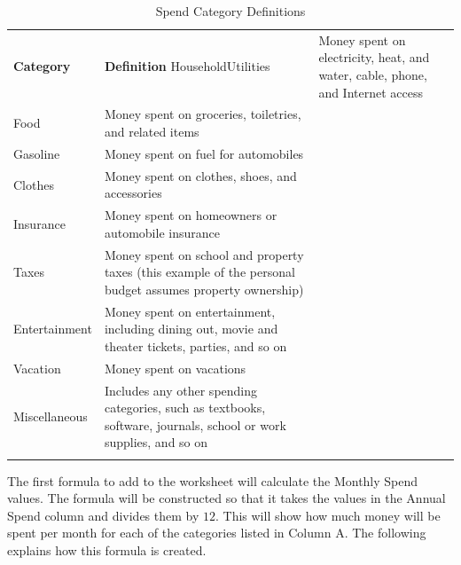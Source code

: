 \begin{table}[H]
	{\small
		\begin{longtable}{L{0.85in}L{3.40in}} %
			\textbf{Category} & \textbf{Definition} \endhead
			\hline
			Household\newline Utilities & Money spent on electricity, heat, and water, cable, phone, and Internet access\\
			Food & Money spent on groceries, toiletries, and related items\\
			Gasoline & Money spent on fuel for automobiles\\
			Clothes & Money spent on clothes, shoes, and accessories\\
			Insurance & Money spent on homeowners or automobile insurance\\
			Taxes & Money spent on school and property taxes (this example of the personal budget assumes property ownership)\\
			Entertainment & Money spent on entertainment, including dining out, movie and theater tickets, parties, and so on\\
			Vacation & Money spent on vacations\\
			Miscellaneous & Includes any other spending categories, such as textbooks, software, journals, school or work supplies, and so on\\
			\caption{Spend Category Definitions}
			\label{02:tab01}
		\end{longtable}
	} %
\end{table}

The first formula to add to the  worksheet will calculate the Monthly Spend values. The formula will be constructed so that it takes the values in the Annual Spend column and divides them by $ 12 $. This will show how much money will be spent per month for each of the categories listed in Column A. The following explains how this formula is created.

